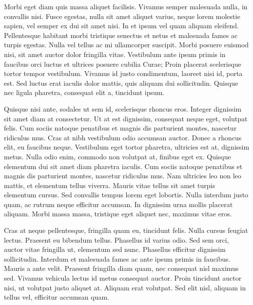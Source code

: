 Morbi eget diam quis massa aliquet facilisis. Vivamus semper malesuada nulla, in convallis nisi. Fusce egestas, nulla sit amet aliquet varius, neque lorem molestie sapien, vel semper ex dui sit amet nisi. In et ipsum vel quam aliquam eleifend. Pellentesque habitant morbi tristique senectus et netus et malesuada fames ac turpis egestas. Nulla vel tellus ac mi ullamcorper suscipit. Morbi posuere euismod nisi, sit amet auctor dolor fringilla vitae. Vestibulum ante ipsum primis in faucibus orci luctus et ultrices posuere cubilia Curae; Proin placerat scelerisque tortor tempor vestibulum. Vivamus id justo condimentum, laoreet nisi id, porta est. Sed luctus erat iaculis dolor mattis, quis aliquam dui sollicitudin. Quisque nec ligula pharetra, consequat elit a, tincidunt ipsum.

Quisque nisi ante, sodales ut sem id, scelerisque rhoncus eros. Integer dignissim sit amet diam at consectetur. Ut at est dignissim, consequat neque eget, volutpat felis. Cum sociis natoque penatibus et magnis dis parturient montes, nascetur ridiculus mus. Cras at nibh vestibulum odio accumsan auctor. Donec a rhoncus elit, eu faucibus neque. Vestibulum eget tortor pharetra, ultricies est at, dignissim metus. Nulla odio enim, commodo non volutpat at, finibus eget ex. Quisque elementum dui sit amet diam pharetra iaculis. Cum sociis natoque penatibus et magnis dis parturient montes, nascetur ridiculus mus. Nam ultricies leo non leo mattis, et elementum tellus viverra. Mauris vitae tellus sit amet turpis elementum cursus. Sed convallis tempus lorem eget lobortis. Nulla interdum justo quam, ac rutrum neque efficitur accumsan. In dignissim urna mollis placerat aliquam. Morbi massa massa, tristique eget aliquet nec, maximus vitae eros.

Cras at neque pellentesque, fringilla quam eu, tincidunt felis. Nulla cursus feugiat lectus. Praesent eu bibendum tellus. Phasellus id varius odio. Sed sem orci, auctor vitae fringilla ut, elementum sed nunc. Phasellus efficitur dignissim sollicitudin. Interdum et malesuada fames ac ante ipsum primis in faucibus. Mauris a ante velit. Praesent fringilla diam quam, nec consequat nisl maximus sed. Vivamus vehicula lectus id metus consequat auctor. Proin tincidunt auctor nisi, ut volutpat justo aliquet at. Aliquam erat volutpat. Sed elit nisl, aliquam in tellus vel, efficitur accumsan quam.